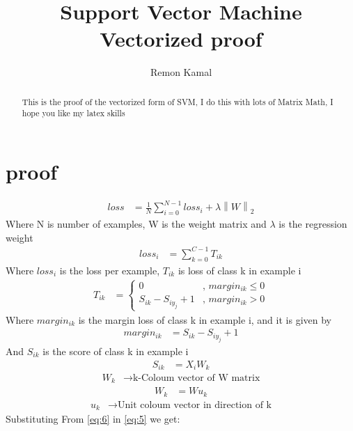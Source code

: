 \documentclass[]{article}
\title{Support Vector Machine Vectorized proof}
\author{Remon Kamal}
\begin{document}
\maketitle

\begin{abstract}

This is the proof of the vectorized form of SVM, I do this with
lots of Matrix Math, I hope you like my latex skills

\end{abstract}

\section{proof}

\begin{align}
	loss &= \frac{1}{N} \sum_{i=0}^{N-1} loss_i + \lambda \left\lVert W \right\rVert_2 \label{eq:1}
\end{align}
Where N is number of examples, W is the weight matrix and $\lambda$ is the regression weight 
\begin{align}
	loss_i &= \sum_{k=0}^{C-1} T_{ik} \label{eq:2}
\end{align}
Where  $loss_i$ is the loss per example, $T_{ik}$ is loss of class k in example i
\begin{align}
	T_{ik} &= \begin{cases}
	0 & \text{, $margin_{ik} \le 0$} \\
	S_{ik} - S_{i y_j} + 1 & \text{, $margin_{ik} > 0$}
	\end{cases} \label{eq:3}
\end{align}
Where $margin_{ik}$ is the margin loss of class k in example i, and it is given by
\begin{align}
	margin_{ik} &= S_{ik} - S_{i y_j} + 1 
\end{align}
And  $S_{ik}$ is the score of class k in example i
\begin{align}
	S_{ik} &= X_{i} W_{k} \label{eq:5}
\end{align}
\begin{align}
	W_{k}  & \rightarrow \text{k-Coloum vector of W matrix} \nonumber
\end{align}
\begin{align}
	W_{k} &= W u_{k} \label{eq:6}
\end{align}
\begin{align}
	u_{k} & \rightarrow \text{Unit coloum vector in direction of k} \nonumber
\end{align}
Substituting From \eqref{eq:6} in \eqref{eq:5} we get:
\end{document}
